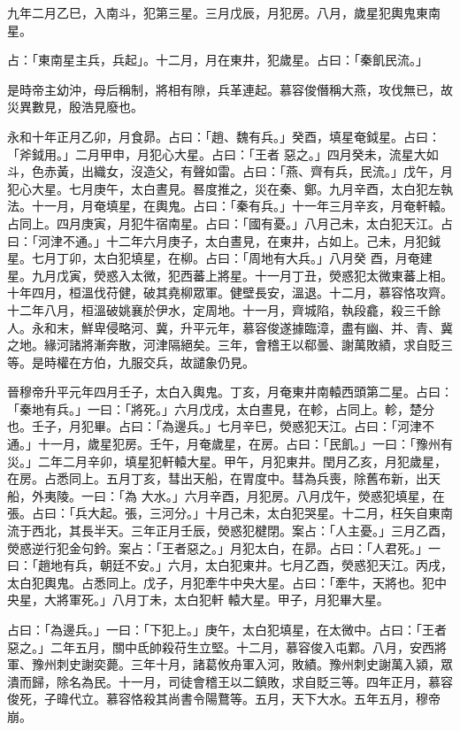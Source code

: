 \begin{pinyinscope}
 九年二月乙巳，入南斗，犯第三星。三月戊辰，月犯房。八月，歲星犯輿鬼東南星。



 占：「東南星主兵，兵起」。十二月，月在東井，犯歲星。占曰：「秦飢民流。」



 是時帝主幼沖，母后稱制，將相有隙，兵革連起。慕容俊僭稱大燕，攻伐無已，故災異數見，殷浩見廢也。



 永和十年正月乙卯，月食昴。占曰：「趙、魏有兵。」癸酉，填星奄鉞星。占曰：「斧鉞用。」二月甲申，月犯心大星。占曰：「王者
 惡之。」四月癸未，流星大如斗，色赤黃，出織女，沒造父，有聲如雷。占曰：「燕、齊有兵，民流。」戊午，月犯心大星。七月庚午，太白晝見。晷度推之，災在秦、鄭。九月辛酉，太白犯左執法。十一月，月奄填星，在輿鬼。占曰：「秦有兵。」十一年三月辛亥，月奄軒轅。占同上。四月庚寅，月犯牛宿南星。占曰：「國有憂。」八月己未，太白犯天江。占曰：「河津不通。」十二年六月庚子，太白晝見，在東井，占如上。己未，月犯鉞星。七月丁卯，太白犯填星，在柳。占曰：「周地有大兵。」八月癸
 酉，月奄建星。九月戊寅，熒惑入太微，犯西蕃上將星。十一月丁丑，熒惑犯太微東蕃上相。十年四月，桓溫伐苻健，破其堯柳眾軍。健壁長安，溫退。十二月，慕容恪攻齊。十二年八月，桓溫破姚襄於伊水，定周地。十一月，齊城陷，執段龕，殺三千餘人。永和末，鮮卑侵略河、冀，升平元年，慕容俊遂據臨漳，盡有幽、并、青、冀之地。緣河諸將漸奔散，河津隔絕矣。三年，會稽王以郗曇、謝萬敗績，求自貶三等。是時權在方伯，九服交兵，故譴象仍見。



 晉穆帝升平元年四月壬子，太白入輿鬼。丁亥，月奄東井南轅西頭第二星。占曰：「秦地有兵。」一曰：「將死。」六月戊戌，太白晝見，在軫，占同上。軫，楚分也。壬子，月犯畢。占曰：「為邊兵。」七月辛巳，熒惑犯天江。占曰：「河津不通。」十一月，歲星犯房。壬午，月奄歲星，在房。占曰：「民飢。」一曰：「豫州有災。」二年二月辛卯，填星犯軒轅大星。甲午，月犯東井。閏月乙亥，月犯歲星，在房。占悉同上。五月丁亥，彗出天船，在胃度中。彗為兵喪，除舊布新，出天船，外夷陵。一曰：「為
 大水。」六月辛酉，月犯房。八月戊午，熒惑犯填星，在張。占曰：「兵大起。張，三河分。」十月己未，太白犯哭星。十二月，枉矢自東南流于西北，其長半天。三年正月壬辰，熒惑犯楗閉。案占：「人主憂。」三月乙酉，熒惑逆行犯金句鈐。案占：「王者惡之。」月犯太白，在昴。占曰：「人君死。」一曰：「趙地有兵，朝廷不安。」六月，太白犯東井。七月乙酉，熒惑犯天江。丙戌，太白犯輿鬼。占悉同上。戊子，月犯牽牛中央大星。占曰：「牽牛，天將也。犯中央星，大將軍死。」八月丁未，太白犯軒
 轅大星。甲子，月犯畢大星。



 占曰：「為邊兵。」一曰：「下犯上。」庚午，太白犯填星，在太微中。占曰：「王者惡之。」二年五月，關中氐帥殺苻生立堅。十二月，慕容俊入屯鄴。八月，安西將軍、豫州刺史謝奕薨。三年十月，諸葛攸舟軍入河，敗績。豫州刺史謝萬入潁，眾潰而歸，除名為民。十一月，司徒會稽王以二鎮敗，求自貶三等。四年正月，慕容俊死，子暐代立。慕容恪殺其尚書令陽鶩等。五月，天下大水。五年五月，穆帝崩。




\end{pinyinscope}
